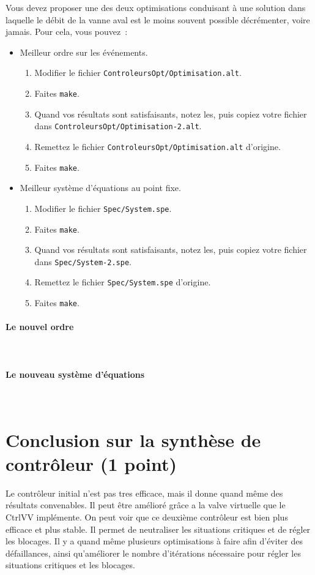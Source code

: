 \documentclass[a4paper]{book}
\begin{document}
Vous devez proposer une des deux optimisations conduisant à une solution dans laquelle le débit de la vanne aval est le moins souvent possible décrémenter, voire jamais. Pour cela, vous pouvez~:
\begin{itemize}
\item Meilleur ordre sur les événements.
  \begin{enumerate}
  \item Modifier le fichier \texttt{ControleursOpt/Optimisation.alt}.
  \item Faites \texttt{make}.
  \item Quand vos résultats sont satisfaisants, notez les, puis copiez votre fichier dans \texttt{ControleursOpt/Optimisation-2.alt}.
  \item Remettez le fichier \texttt{ControleursOpt/Optimisation.alt} d'origine.
  \item Faites \texttt{make}.
  \end{enumerate}
\item Meilleur système d'équations au point fixe.
  \begin{enumerate}
  \item Modifier le fichier \texttt{Spec/System.spe}.
  \item Faites \texttt{make}.
  \item Quand vos résultats sont satisfaisants, notez les, puis copiez votre fichier dans \texttt{Spec/System-2.spe}.
  \item Remettez le fichier \texttt{Spec/System.spe} d'origine.
  \item Faites \texttt{make}.
  \end{enumerate}
\end{itemize}

\paragraph{Le nouvel ordre}\ \\
\small{}

\paragraph{Le nouveau système d'équations}\ \\
\small{}

\section{Conclusion sur la synthèse de contrôleur (1 point)}
Le contrôleur initial n'est pas tres efficace, mais il donne quand même des résultats convenables.
Il peut être amélioré grâce a la valve virtuelle que le CtrlVV implémente. On peut voir que ce deuxième
contrôleur est bien plus efficace et plus stable. Il permet de neutraliser les situations critiques et de
régler les blocages. Il y a quand même plusieurs optimisations à faire afin d'éviter des défaillances, ainsi
qu'améliorer le nombre d'itérations nécessaire pour régler les situations critiques et les blocages.
\end{document}
